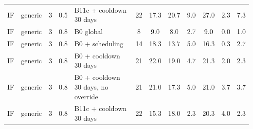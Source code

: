 \documentclass[10pt,onecolumn,letterpaper]{article}
\begin{document}
\begin{longtable}{lllllccccccc}
IF & generic & 3 & 0.5 & B11c + cooldown 30 days & 22 & 17.3 & 20.7 & 9.0 & 27.0 & 2.3 & 7.3 \\
IF & generic & 3 & 0.8 & B0 global & 8 & 9.0 & 8.0 & 2.7 & 9.0 & 0.0 & 1.0 \\
IF & generic & 3 & 0.8 & B0 + scheduling & 14 & 18.3 & 13.7 & 5.0 & 16.3 & 0.3 & 2.7 \\
IF & generic & 3 & 0.8 & B0 + cooldown 30 days & 21 & 22.0 & 19.0 & 4.7 & 21.3 & 2.0 & 2.3 \\
IF & generic & 3 & 0.8 & B0 + cooldown 30 days, no override & 21 & 21.0 & 17.3 & 5.0 & 21.0 & 3.7 & 3.7 \\
IF & generic & 3 & 0.8 & B11c + cooldown 30 days & 22 & 15.3 & 18.0 & 2.3 & 20.3 & 4.0 & 2.3 \\
\bottomrule
\end{longtable}
\end{document}
